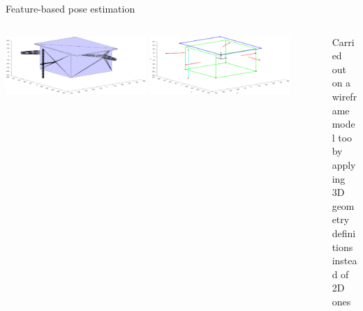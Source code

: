 \documentclass[10pt]{beamer}
\begin{document}
\begin{frame}{Feature-based pose estimation}
  \bigskip

  \begin{columns}[T,onlytextwidth]
    \begin{column}{0.6\textwidth}
      \vspace{0.38cm}
      \hspace{-0.3cm}
      \includegraphics[width=0.45\textwidth]{gfx/cadFull.eps}
      \hspace{0.1cm}
      \includegraphics[width=0.45\textwidth]{gfx/wireframeModel.eps}
    \end{column}
    \hspace{0.2cm}
    \begin{column}{0.45\textwidth}
    Carried out on a wireframe\\ model too by applying 3D\\ geometry definitions\\ instead of 2D ones
    \end{column}
  \end{columns}

\end{frame}
\end{document}
